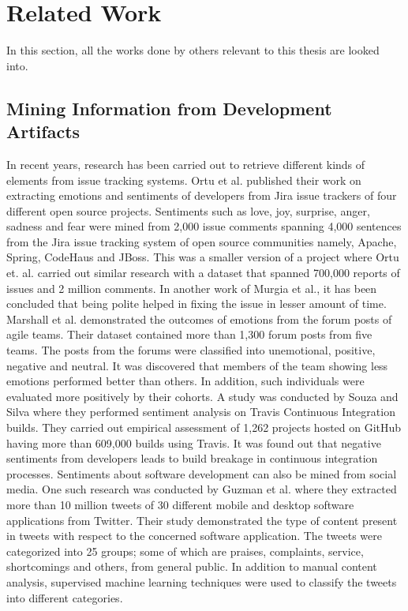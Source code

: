 \documentclass[a4paper,12pt,twoside]{report}
\begin{document}
\section{Related Work}

In this section, all the works done by others relevant to this thesis are looked into. 

\subsection{Mining Information from Development Artifacts}
In recent years, research has been carried out to retrieve different kinds of elements from issue tracking systems. Ortu et al.\cite{Ortu2017} published their work on extracting emotions and sentiments of developers from Jira issue trackers of four different open source projects.  Sentiments such as love, joy, surprise, anger, sadness and fear were mined from 2,000 issue comments spanning 4,000 sentences from the Jira issue tracking system of open source communities namely, Apache, Spring, CodeHaus and JBoss. This was a smaller version of a project where Ortu et. al.\cite{Ortu2015} carried out similar research with a dataset that spanned 700,000 reports of issues and 2 million comments. In another work of Murgia et al.\cite{Murgia2014}, it has been concluded that being polite helped in fixing the issue in lesser amount of time. 
\newline \newline
Marshall et al.\cite{Marshall2016} demonstrated the outcomes of emotions from the forum posts of agile teams. Their dataset contained more than 1,300 forum posts from five teams. The posts from the forums were classified into unemotional, positive, negative and neutral. It was discovered that members of the team showing less emotions performed better than others. In addition, such individuals were evaluated more positively by their cohorts. 
\newline \newline
A study was conducted by Souza and Silva \cite{Souza2017} where they performed sentiment analysis on Travis Continuous Integration builds. They carried out empirical assessment of 1,262 projects hosted on GitHub having more than 609,000 builds using Travis. It was found out that negative sentiments from developers leads to build breakage in continuous integration processes. 
\newline \newline
Sentiments about software development can also be mined from social media. One such research was conducted by Guzman et al.\cite{Guzman2017} where they extracted more than 10 million tweets of 30 different mobile and desktop software applications from Twitter. Their study demonstrated the type of content present in tweets with respect to the concerned software application. The tweets were categorized into 25 groups; some of which are praises, complaints, service, shortcomings and others, from general public. In addition to manual content analysis, supervised machine learning techniques were used to classify the tweets into different categories. 
\end{document}
